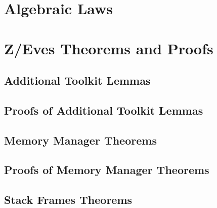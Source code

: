 \documentclass[a4paper,11pt]{report}
\begin{document}
\begin{refsection}
\chapter{Algebraic Laws}
\label{algebraic-laws-appendix}



\chapter{Z/Eves Theorems and Proofs}
\label{zeves-proofs}

\section{Additional Toolkit Lemmas}
\label{additional-lemmas}
\normalsize

 

\section{Proofs of Additional Toolkit Lemmas}
\label{additional-lemmas-proofs}
\scriptsize





\section{Memory Manager Theorems}
\label{memory-manager-theorems}
\normalsize



\section{Proofs of Memory Manager Theorems}
\label{memory-manager-proofs}
\scriptsize



\section{Stack Frames Theorems}
\label{stack-frames-theorems-appendix}




\end{refsection}
\end{document}
